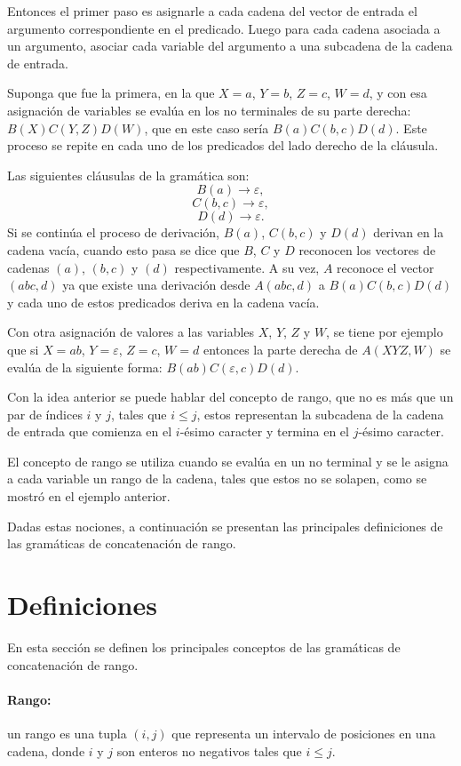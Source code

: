 \documentclass[12pt]{article}
\begin{document}
Entonces el primer paso es asignarle a cada cadena del vector de entrada el argumento correspondiente 
en el predicado. Luego para cada cadena asociada a un argumento, asociar cada variable del argumento
a una subcadena de la cadena de entrada.

Suponga que fue la primera, en la que $X=a$, $Y = b$, $Z = c$, $W=d$, y con esa asignación de variables
se evalúa en los no terminales de su parte derecha: $B(X)C(Y,Z)D(W)$, que en este caso sería $B(a)C(b,c)D(d)$.
Este proceso se repite en cada uno de los predicados del lado derecho de la cláusula.

Las siguientes cláusulas de la gramática son:
$$B(a)\to \varepsilon,$$
$$C(b,c)\to \varepsilon,$$
$$D(d)\to \varepsilon.$$
Si se continúa el proceso de derivación, $B(a)$, $C(b,c)$ y $D(d)$ derivan en la cadena vacía, cuando esto pasa se dice
que $B$, $C$ y $D$ reconocen los vectores de cadenas $(a)$, $(b,c)$ y $(d)$ respectivamente. A su vez, $A$ reconoce el
vector $(abc,d)$ ya que existe una derivación desde $A(abc,d)$ a $B(a)C(b,c)D(d)$ y cada uno de estos predicados deriva en la cadena vacía. 

Con otra asignación de valores a las variables $X$, $Y$, $Z$ y $W$, se tiene por ejemplo que si $X=ab$, $Y = \varepsilon$, $Z=c$, $W=d$
entonces la parte derecha de $A(XYZ,W)$ se evalúa de la siguiente forma: $B(ab)C(\varepsilon,c)D(d)$.

Con la idea anterior se puede hablar del concepto de rango, que no es más que un par de índices $i$ y $j$, tales que $i\leq j$, estos
representan la subcadena de la cadena de entrada que comienza en el $i$-ésimo caracter y termina en el $j$-ésimo caracter.

El concepto de rango se utiliza cuando se evalúa en un no terminal y se le asigna a cada variable un rango de la cadena, tales
que estos no se solapen, como se mostró en el ejemplo anterior.

Dadas estas nociones, a continuación se presentan las principales definiciones de las gramáticas de concatenación de rango.

\section{Definiciones}

En esta sección se definen los principales conceptos de las gramáticas de concatenación de rango.

\paragraph{Rango:} un rango es una tupla $(i, j)$ que representa un intervalo de posiciones en una cadena, donde $i$ y $j$ son enteros no negativos tales que $i \leq j$.
\end{document}
